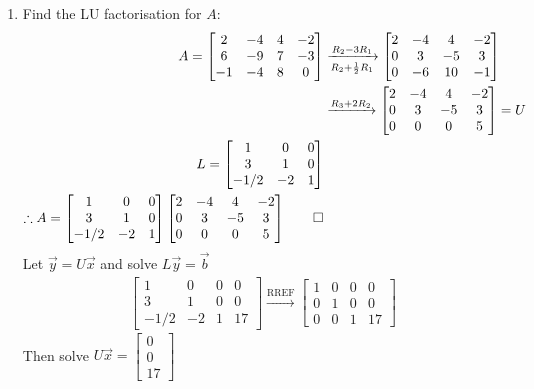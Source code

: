 \documentclass[12pt, a4paper]{article}
\begin{document}
\begin{enumerate}[Q\arabic*.]
\begin{enumerate}[(\alph*)]
      \item Find the LU factorisation for $A$:
        \begin{align*}
          A = \begin{bmatrix}2&-4&4&-2\\6&-9&7&-3\\-1&-4&8&0\end{bmatrix} &\xrightarrow[R_2+\frac{1}{2}R_1]{R_2-3R_1}
          \begin{bmatrix}2&-4&4&-2\\0&3&-5&3\\0&-6&10&-1\end{bmatrix} \\&\xrightarrow{R_3+2R_2}
          \begin{bmatrix}2&-4&4&-2\\0&3&-5&3\\0&0&0&5\end{bmatrix} = U \\
          L = \begin{bmatrix}1&0&0\\3&1&0\\-1/2&-2&1\end{bmatrix}\\
          \therefore A =  \begin{bmatrix}1&0&0\\3&1&0\\-1/2&-2&1\end{bmatrix} \begin{bmatrix}2&-4&4&-2\\0&3&-5&3\\0&0&0&5\end{bmatrix} \qed 
        \end{align*}
        Let $\vec{y} = U \vec{x}$ and solve $L \vec{y} = \vec{b}$
        \begin{align*}
          \begin{bmatrix}1&0&0&0\\3&1&0&0\\-1/2&-2&1&17\end{bmatrix} \xrightarrow{\text{RREF}}
          \begin{bmatrix}1&0&0&0\\0&1&0&0\\0&0&1&17\end{bmatrix}
        \end{align*}
        Then solve $U \vec{x} = \begin{bmatrix}0\\0\\17\end{bmatrix}$

\end{enumerate}
\end{enumerate}
\end{document}
